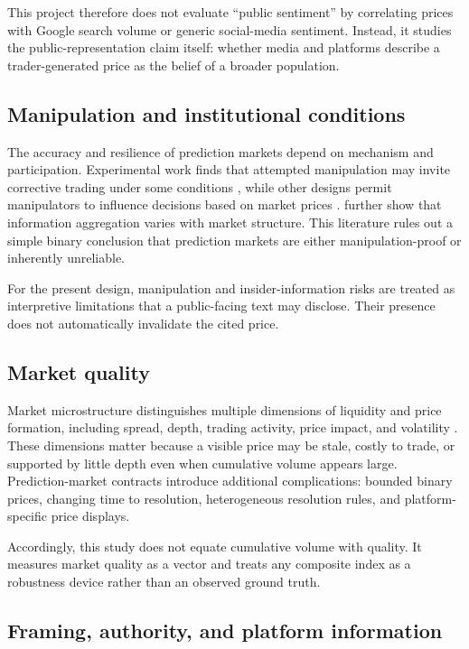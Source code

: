 This project therefore does not evaluate ``public sentiment'' by correlating prices with Google search volume or generic social-media sentiment. Instead, it studies the public-representation claim itself: whether media and platforms describe a trader-generated price as the belief of a broader population.

\subsection{Manipulation and institutional conditions}

The accuracy and resilience of prediction markets depend on mechanism and participation. Experimental work finds that attempted manipulation may invite corrective trading under some conditions \citep{hanson2006information}, while other designs permit manipulators to influence decisions based on market prices \citep{deck2013affecting}. \citet{jian2012aggregation} further show that information aggregation varies with market structure. This literature rules out a simple binary conclusion that prediction markets are either manipulation-proof or inherently unreliable.

For the present design, manipulation and insider-information risks are treated as interpretive limitations that a public-facing text may disclose. Their presence does not automatically invalidate the cited price.

\subsection{Market quality}

Market microstructure distinguishes multiple dimensions of liquidity and price formation, including spread, depth, trading activity, price impact, and volatility \citep{ohara1995market,hasbrouck2007empirical,foucault2013market}. These dimensions matter because a visible price may be stale, costly to trade, or supported by little depth even when cumulative volume appears large. Prediction-market contracts introduce additional complications: bounded binary prices, changing time to resolution, heterogeneous resolution rules, and platform-specific price displays.

Accordingly, this study does not equate cumulative volume with quality. It measures market quality as a vector and treats any composite index as a robustness device rather than an observed ground truth.

\subsection{Framing, authority, and platform information}

